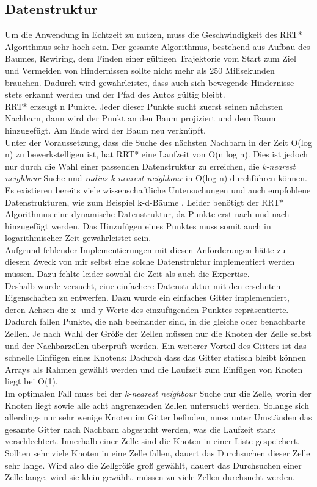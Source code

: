 \subsection{Datenstruktur}
Um die Anwendung in Echtzeit zu nutzen, muss die Geschwindigkeit des RRT* Algorithmus sehr hoch sein. Der gesamte Algorithmus, bestehend aus Aufbau des Baumes, Rewiring, dem Finden einer gültigen Trajektorie vom Start zum Ziel und Vermeiden von Hindernissen sollte nicht mehr als 250 Milisekunden brauchen. Dadurch wird gewährleistet, dass auch sich bewegende Hindernisse stets erkannt werden und der Pfad des Autos gültig bleibt. \\
RRT* erzeugt n Punkte. Jeder dieser Punkte sucht zuerst seinen nächsten Nachbarn, dann wird der Punkt an den Baum projiziert und dem Baum hinzugefügt. Am Ende wird der Baum neu verknüpft. \\
Unter der Voraussetzung, dass die Suche des nächsten Nachbarn in der Zeit O(log n) zu bewerkstelligen ist, hat RRT* eine Laufzeit von O(n log n). Dies ist jedoch nur durch die Wahl einer passenden Datenstruktur zu erreichen, die \textit{k-nearest neighbour} Suche und \textit{radius k-nearest neighbour} in O(log n) durchführen können.\\
Es existieren bereits viele wissenschaftliche Untersuchungen und auch empfohlene Datenstrukturen, wie zum Beispiel k-d-Bäume \citep{Bentley75}. Leider benötigt der RRT* Algorithmus eine dynamische Datenstruktur, da Punkte erst nach und nach hinzugefügt werden. Das Hinzufügen eines Punktes muss somit auch in logarithmischer Zeit gewährleistet sein. \\
Aufgrund fehlender Implementierungen mit diesen Anforderungen hätte zu diesem Zweck von mir selbst eine solche Datenstruktur implementiert werden müssen. Dazu fehlte leider sowohl die Zeit als auch die Expertise. \\
Deshalb wurde versucht, eine einfachere Datenstruktur mit den ersehnten Eigenschaften zu entwerfen. Dazu wurde ein einfaches Gitter implementiert, deren Achsen die x- und y-Werte des einzufügenden Punktes repräsentierte. Dadurch fallen Punkte, die nah beeinander sind, in die gleiche oder benachbarte Zellen. Je nach Wahl der Größe der Zellen müssen nur die Knoten der Zelle selbst und der Nachbarzellen überprüft werden. Ein weiterer Vorteil des Gitters ist das schnelle Einfügen eines Knotens: Dadurch dass das Gitter statisch bleibt können Arrays als Rahmen gewählt werden und die Laufzeit zum Einfügen von Knoten liegt bei O(1).\\
Im optimalen Fall muss bei der \textit{k-nearest neighbour} Suche nur die Zelle, worin der Knoten liegt sowie alle acht angrenzenden Zellen untersucht werden. Solange sich allerdings nur sehr wenige Knoten im Gitter befinden, muss unter Umständen das gesamte Gitter nach Nachbarn abgesucht werden, was die Laufzeit stark verschlechtert. Innerhalb einer Zelle sind die Knoten in einer Liste gespeichert. Sollten sehr viele Knoten in eine Zelle fallen, dauert das Durchsuchen dieser Zelle sehr lange. Wird also die Zellgröße groß gewählt, dauert das Durchsuchen einer Zelle lange, wird sie klein gewählt, müssen zu viele Zellen durchsucht werden. \\
